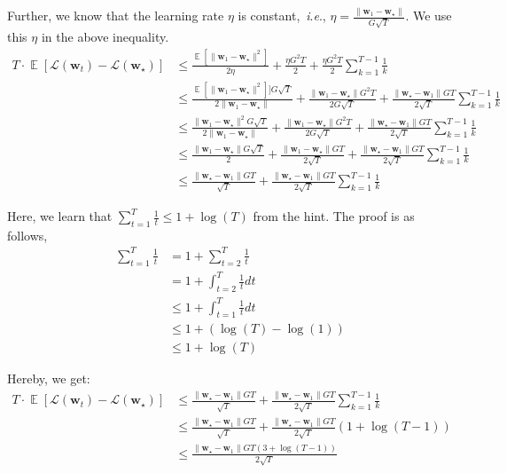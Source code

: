 \documentclass[letterpaper]{article}
\newcommand{\E}{\mathop{\mathbb{E}}}
\renewcommand{\L}{\mathcal{L}}
\newcommand{\bw}{\mathbf{w}}
\newcommand{\ie}{\emph{i}.\emph{e}.}
\begin{document}
\begin{enumerate}
	Further, we know that the learning rate $\eta$ is constant,~\ie, $\eta = \frac{\|\bw_1-\bw_\star\|}{G\sqrt{T}}$. We use this $\eta$ in the above inequality.
	\begin{equation}
		\begin{aligned}
			T\cdot\E[\L(\bw_t)-\L(\bw_\star)]&\le \frac{\E[\|\bw_1-\bw_\star\|^2]}{2\eta}+\frac{\eta G^2T}{2} + \frac{\eta G^2T}{2}\sum_{k=1}^{T-1}\frac{1}{k}\\
			&\le \frac{\E[\|\bw_1-\bw_\star\|^2]]G\sqrt{T}}{2\| \bw_1-\bw_\star \|}+\frac{\| \bw_1-\bw_\star \|G^2T}{2G\sqrt{T}} + \frac{\| \bw_\star - \bw_1 \| GT}{2\sqrt{T}}\sum_{k=1}^{T-1}\frac{1}{k}\\
			&\le \frac{\|\bw_1-\bw_\star\|^2G\sqrt{T}}{2\| \bw_1-\bw_\star \|}+\frac{\| \bw_1-\bw_\star \|G^2T}{2G\sqrt{T}} + \frac{\| \bw_\star - \bw_1 \| GT}{2\sqrt{T}}\sum_{k=1}^{T-1}\frac{1}{k}\\
			&\le \frac{\|\bw_1-\bw_\star \|G\sqrt{T}}{2}+\frac{\| \bw_1-\bw_\star \|GT}{2\sqrt{T}} + \frac{\| \bw_\star - \bw_1 \| GT}{2\sqrt{T}}\sum_{k=1}^{T-1}\frac{1}{k}\\
			&\le \frac{\| \bw_\star - \bw_1 \| GT}{\sqrt{T}} + \frac{\| \bw_\star - \bw_1 \| GT}{2\sqrt{T}}\sum_{k=1}^{T-1}\frac{1}{k}
		\end{aligned}
	\end{equation}
	
	Here, we learn that $\sum_{t=1}^T \frac{1}{t} \le 1+\log(T)$ from the hint. The proof is as follows,
	\begin{equation}
		\begin{aligned}
			\sum_{t=1}^T \frac{1}{t}&=1 + \sum_{t=2}^T \frac{1}{t}\\
			&=1 + \int_{t=2}^T \frac{1}{t} dt\\
			&\le1 + \int_{t=1}^T \frac{1}{t} dt\\
			&\le1 + \left(\log{(T)}-\log{(1)}\right)\\
			&\le1 + \log{(T)}
		\end{aligned}
	\end{equation}
	
	Hereby, we get:
	\begin{equation}
		\begin{aligned}
			T\cdot\E[\L(\bw_t)-\L(\bw_\star)]&\le \frac{\| \bw_\star - \bw_1 \| GT}{\sqrt{T}} + \frac{\| \bw_\star - \bw_1 \| GT}{2\sqrt{T}}\sum_{k=1}^{T-1}\frac{1}{k}\\
			&\le \frac{\| \bw_\star - \bw_1 \| GT}{\sqrt{T}} + \frac{\| \bw_\star - \bw_1 \| GT}{2\sqrt{T}}(1+\log(T-1))\\
			&\le \frac{\| \bw_\star - \bw_1 \| GT (3 + \log(T-1))}{2\sqrt{T}}
		\end{aligned}
	\end{equation}
	

\end{enumerate}
\end{document}
